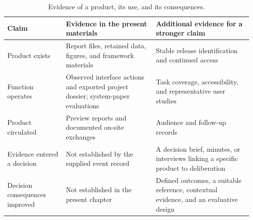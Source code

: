 \begin{table}[tbp]
\caption{Evidence of a product, its use, and its consequences.}
\label{tab:ch10-use}
\centering\small\setlength{\tabcolsep}{4pt}\renewcommand{\arraystretch}{1.2}
\begin{tabularx}{\linewidth}{@{}>{\raggedright\arraybackslash}p{.18\linewidth}*{2}{>{\raggedright\arraybackslash}X}@{}}
\toprule
Claim & Evidence in the present materials & Additional evidence for a stronger claim \\
\midrule
Product exists & Report files, retained data, figures, and framework materials & Stable release identification and continued access \\
\addlinespace
Function operates & Observed interface actions and exported project dossier; system-paper evaluations & Task coverage, accessibility, and representative user studies \\
\addlinespace
Product circulated & Preview reports and documented on-site exchanges & Audience and follow-up records \\
\addlinespace
Evidence entered a decision & Not established by the supplied event record & A decision brief, minutes, or interviews linking a specific product to deliberation \\
\addlinespace
Decision consequences improved & Not established in the present chapter & Defined outcomes, a suitable reference, contextual evidence, and an evaluative design \\
\bottomrule
\end{tabularx}
\end{table}
